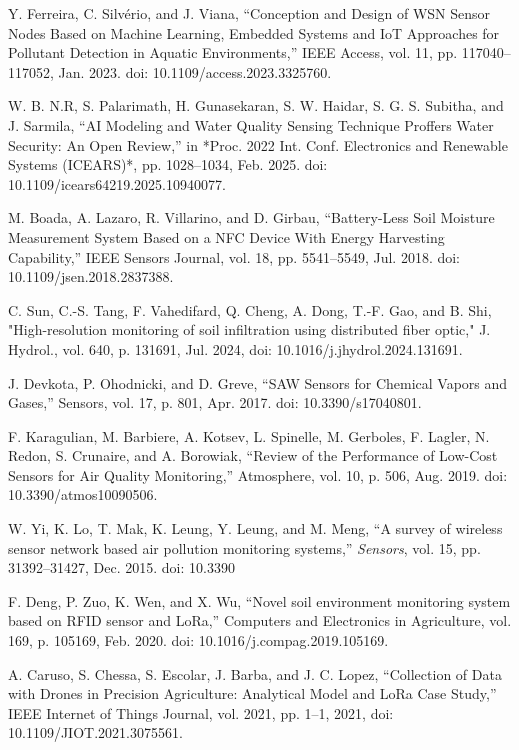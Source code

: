 \documentclass[conference]{IEEEtran}
\begin{document}
\begin{thebibliography}{00}
 Y. Ferreira, C. Silvério, and J. Viana, 
``Conception and Design of WSN Sensor Nodes Based on Machine Learning, Embedded Systems and IoT Approaches for Pollutant Detection in Aquatic Environments,'' 
IEEE Access, vol. 11, pp. 117040--117052, Jan. 2023. doi: 10.1109/access.2023.3325760.

 W. B. N.R, S. Palarimath, H. Gunasekaran, S. W. Haidar, S. G. S. Subitha, and J. Sarmila, 
``AI Modeling and Water Quality Sensing Technique Proffers Water Security: An Open Review,'' 
in *Proc. 2022 Int. Conf. Electronics and Renewable Systems (ICEARS)*, pp. 1028--1034, Feb. 2025. doi: 10.1109/icears64219.2025.10940077.

 M. Boada, A. Lazaro, R. Villarino, and D. Girbau, 
``Battery-Less Soil Moisture Measurement System Based on a NFC Device With Energy Harvesting Capability,'' 
IEEE Sensors Journal, vol. 18, pp. 5541--5549, Jul. 2018. 
doi: 10.1109/jsen.2018.2837388.

 C. Sun, C.-S. Tang, F. Vahedifard, Q. Cheng, A. Dong, T.-F. Gao, and B. Shi, "High-resolution monitoring of soil infiltration using distributed fiber optic," J. Hydrol., vol. 640, p. 131691, Jul. 2024, doi: 10.1016/j.jhydrol.2024.131691.

 J. Devkota, P. Ohodnicki, and D. Greve, 
``SAW Sensors for Chemical Vapors and Gases,'' 
Sensors, vol. 17, p. 801, Apr. 2017. 
doi: 10.3390/s17040801.

 F. Karagulian, M. Barbiere, A. Kotsev, L. Spinelle, M. Gerboles, F. Lagler, N. Redon, S. Crunaire, and A. Borowiak, 
``Review of the Performance of Low-Cost Sensors for Air Quality Monitoring,'' 
Atmosphere, vol. 10, p. 506, Aug. 2019. doi: 10.3390/atmos10090506.

 W. Yi, K. Lo, T. Mak, K. Leung, Y. Leung, and M. Meng, ``A survey of wireless sensor network based air pollution monitoring systems,'' \emph{Sensors}, vol. 15, pp. 31392--31427, Dec. 2015. doi: 10.3390

 F. Deng, P. Zuo, K. Wen, and X. Wu, 
``Novel soil environment monitoring system based on RFID sensor and LoRa,'' 
Computers and Electronics in Agriculture, vol. 169, p. 105169, Feb. 2020. doi: 10.1016/j.compag.2019.105169.

 A. Caruso, S. Chessa, S. Escolar, J. Barba, and J. C. Lopez, “Collection of Data with Drones in Precision Agriculture: Analytical Model and LoRa Case Study,” IEEE Internet of Things Journal, vol. 2021, pp. 1–1, 2021, doi: 10.1109/JIOT.2021.3075561.


\end{thebibliography}
\end{document}
